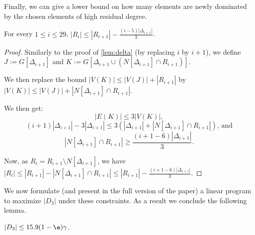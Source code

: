 Finally, we can give a lower bound on how many elements are newly
dominated by the chosen elements of high residual degree.

\begin{lemma}\label{lem:h2}
  For every $1\leq i\leq 29$, $|R_i| \le |R_{i+1}| - \frac{(i-5)|\Delta_{i+1}|}{3}$.
\end{lemma}


\begin{proof}
  Similarly to the proof of \cref{lem:delta} (by replacing $i$ by
  $i+1$), we define $J := G[\Delta_{i+1}]$ and
  $K:= G[\Delta_{i+1} \cup (N[\Delta_{i+1}]\cap R_{i+1})]$.

  We then
  replace the bound $|V(K)| \le |V(J)| + |R_{i+1}|$ by
  $|V(K)| \le |V(J)| + |N[\Delta_{i+1}]\cap R_{i+1}|$.

  We then get:
  \[|E(K)| \leq 3 |V(K)|, \]
  \[(i+1)|\Delta_{i+1}| - 3|\Delta_{i+1}| \leq 3(|\Delta_{i+1}| +
    |N[\Delta_{i+1}]\cap R_{i+1}|)\text{, and}\]
  \[ |N[\Delta_{i+1}]\cap R_{i+1}| \geq \frac{(i+1-6)|\Delta_{i+1}|}{3}.\]

  Now, as $R_i = R_{i+1} \setminus N[\Delta_{i+1}]$, we have
  $|R_i| \le |R_{i+1}| - |N[\Delta_{i+1}]\cap R_{i+1}|\leq |R_{i+1}| -
  \frac{(i+1-6)|\Delta_{i+1}|}{3}$.
\end{proof}

We now formulate (and present in the full version of the paper) %
a linear program to
maximize $|D_3|$ under these constraints. As a result we conclude the
following lemma.

\begin{lemma}\label{lem:size-D3}
  $|D_3|\le 15.9(1-\e)\gamma$.
\end{lemma}

